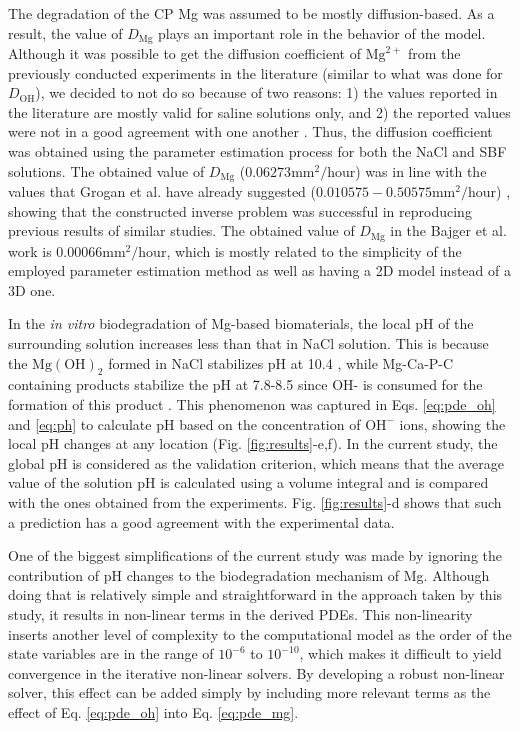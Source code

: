 The degradation of the \gls{CP} Mg was assumed to be mostly diffusion-based. As a result, the value of $D_\mathrm{Mg}$ plays an important role in the behavior of the model. Although it was possible to get the diffusion coefficient of $\mathrm{Mg}^{2+}$ from the previously conducted experiments in the literature (similar to what was done for $D_\mathrm{OH}$), we decided to not do so because of two reasons: 1) the values reported in the literature are mostly valid for saline solutions only, and 2) the reported values were not in a good agreement with one another \cite{Grogan2014,Sun2012}. Thus, the diffusion coefficient was obtained using the parameter estimation process for both the NaCl and \gls{SBF} solutions. The obtained value of $D_\mathrm{Mg}$ ($0.06273 \mathrm{mm}^2/\mathrm{hour}$) was in line with the values that Grogan et al. have already suggested ($0.010575-0.50575 \mathrm{mm}^2/\mathrm{hour}$) \cite{Grogan2014}, showing that the constructed inverse problem was successful in reproducing previous results of similar studies. The obtained value of $D_\mathrm{Mg}$ in the Bajger et al. work \cite{Bajger2016} is $0.00066\mathrm{mm}^2/\mathrm{hour}$, which is mostly related to the simplicity of the employed parameter estimation method as well as having a 2D model instead of a 3D one.


In the \textit{in vitro} biodegradation of Mg-based biomaterials, the local pH of the surrounding solution increases less than that in NaCl solution. This is because the $\mathrm{Mg(OH)}_2$ formed in NaCl stabilizes pH at 10.4 \cite{Santucci2018}, while Mg-Ca-P-C containing products stabilize the pH at 7.8-8.5 since OH- is consumed for the formation of this product \cite{Lamaka2018,Mei2019}. This phenomenon was captured in Eqs. \ref{eq:pde_oh} and \ref{eq:ph} to calculate pH based on the concentration of $\mathrm{OH}^{-}$ ions, showing the local pH changes at any location (Fig. \ref{fig:results}-e,f). In the current study, the global pH is considered as the validation criterion, which means that the average value of the solution pH is calculated using a volume integral and is compared with the ones obtained from the experiments. Fig. \ref{fig:results}-d shows that such a prediction has a good agreement with the experimental data.


One of the biggest simplifications of the current study was made by ignoring the contribution of pH changes to the biodegradation mechanism of Mg. Although doing that is relatively simple and straightforward in the approach taken by this study, it results in non-linear terms in the derived \gls{PDE}s. This non-linearity inserts another level of complexity to the computational model as the order of the state variables are in the range of $10^{-6}$ to $10^{-10}$, which makes it difficult to yield convergence in the iterative non-linear solvers. By developing a robust non-linear solver, this effect can be added simply by including more relevant terms as the effect of Eq. \ref{eq:pde_oh} into Eq. \ref{eq:pde_mg}.

